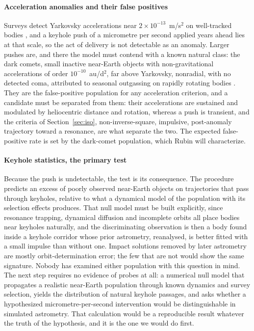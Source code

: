 \documentclass[preprint,12pt]{elsarticle}
\theoremstyle{definition}
\begin{document}
\paragraph{Acceleration anomalies and their false positives} Surveys detect Yarkovsky accelerations near $2 \times 10^{-13}$~m/s$^2$ on well-tracked bodies \citep{Greenberg2020}, and a keyhole push of a micrometre per second applied years ahead lies at that scale, so the act of delivery is not detectable as an anomaly. Larger pushes are, and there the model must contend with a known natural class: the dark comets, small inactive near-Earth objects with non-gravitational accelerations of order $10^{-10}$~au/d$^{2}$, far above Yarkovsky, nonradial, with no detected coma, attributed to seasonal outgassing on rapidly rotating bodies \citep{Seligman2023,Taylor2023}. They are the false-positive population for any acceleration criterion, and a candidate must be separated from them: their accelerations are sustained and modulated by heliocentric distance and rotation, whereas a push is transient, and the criteria of Section~\ref{sec:iso}, non-inverse-square, impulsive, post-anomaly trajectory toward a resonance, are what separate the two. The expected false-positive rate is set by the dark-comet population, which Rubin will characterize.

\paragraph{Keyhole statistics, the primary test} Because the push is undetectable, the test is its consequence. The procedure predicts an excess of poorly observed near-Earth objects on trajectories that pass through keyholes, relative to what a dynamical model of the population with its selection effects produces. That null model must be built explicitly, since resonance trapping, dynamical diffusion and incomplete orbits all place bodies near keyholes naturally, and the discriminating observation is then a body found inside a keyhole corridor whose prior astrometry, reanalysed, is better fitted with a small impulse than without one. Impact solutions removed by later astrometry are mostly orbit-determination error; the few that are not would show the same signature. Nobody has examined either population with this question in mind. The next step requires no evidence of probes at all: a numerical null model that propagates a realistic near-Earth population through known dynamics and survey selection, yields the distribution of natural keyhole passages, and asks whether a hypothesized micrometre-per-second intervention would be distinguishable in simulated astrometry. That calculation would be a reproducible result whatever the truth of the hypothesis, and it is the one we would do first.
\end{document}
